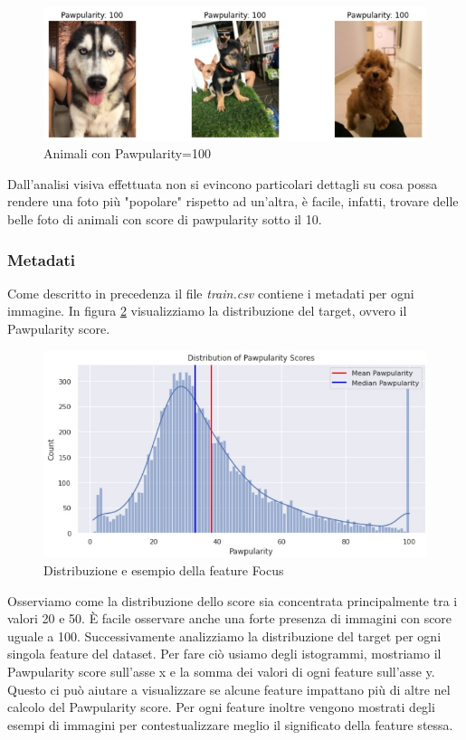     \begin{figure}[H]
        \centering
        \includegraphics[scale=0.5]{Plot/pawpularity_100.jpg}
        \caption{Animali con Pawpularity=100}
        \label{fig:paw_100}
    \end{figure}

    Dall'analisi visiva effettuata non si evincono particolari dettagli su cosa possa rendere una foto più "popolare" rispetto ad un'altra, è facile, infatti, trovare delle belle foto di animali con score di pawpularity sotto il 10.

    \subsubsection{Metadati}
    Come descritto in precedenza il file \textit{train.csv} contiene i metadati per ogni immagine. In figura \ref{fig:target} visualizziamo la distribuzione del target, ovvero il Pawpularity score.
    \begin{figure}[H]
        \centering
        \includegraphics[scale=0.8]{Plot/distribution_target.jpg}
        \caption{Distribuzione e esempio della feature Focus}
        \label{fig:target}
    \end{figure}

    Osserviamo come la distribuzione dello score sia concentrata principalmente tra i valori 20 e 50. È facile osservare anche una forte presenza di immagini con score uguale a 100.
    Successivamente analizziamo la distribuzione del target per ogni singola feature del dataset.
    Per fare ciò usiamo degli istogrammi, mostriamo il Pawpularity score sull'asse x e la somma dei valori di ogni feature sull'asse y. Questo ci può aiutare a visualizzare se alcune feature impattano più di altre nel calcolo del Pawpularity score. Per ogni feature inoltre vengono mostrati degli esempi di immagini per contestualizzare meglio il significato della feature stessa.

